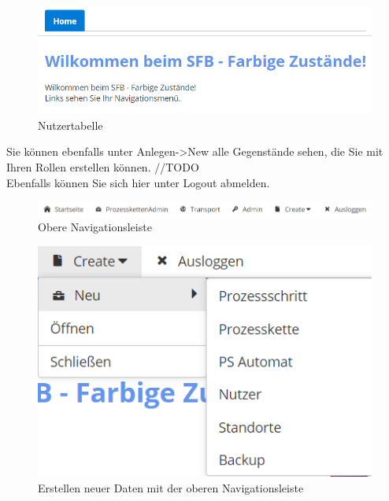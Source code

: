 \documentclass[enabledeprecatedfontcommands,fontsize=12pt,paper=a4,twoside]{scrartcl}
\begin{document}
\begin{figure}[h!]
\begin{center}
 \includegraphics[width=\textwidth]{screenshots/allgemein/willkommeneingeloggt.png}
  \caption{Nutzertabelle}
  \label{fig:boat1}
\end{center}
\end{figure}

Sie können ebenfalls unter Anlegen->New alle Gegenstände sehen, die Sie mit Ihren Rollen erstellen können. //TODO \\
Ebenfalls können Sie sich hier unter Logout abmelden. \\


\begin{figure}[h!]
\begin{center}
 \includegraphics[width=\textwidth]{screenshots/allgemein/navigationoben.png}
  \caption{Obere Navigationsleiste}
  \label{fig:boat1}
\end{center}
\end{figure}

\begin{figure}[h!]
\begin{center}
 \includegraphics[width=\textwidth]{screenshots/allgemein/navigationcreate.png}
  \caption{Erstellen neuer Daten mit der oberen Navigationsleiste}
  \label{fig:boat1}
\end{center}
\end{figure}
\end{document}
